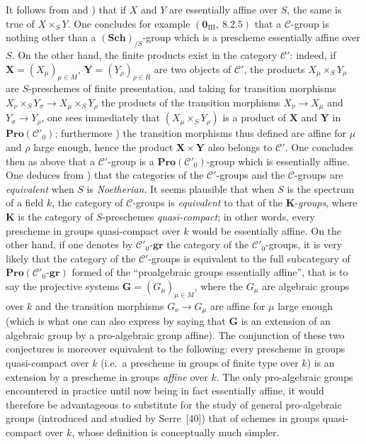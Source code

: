 \begin{remark}[8.13.6]
\label{IV.8.13.6}
It follows from  and ) that if $X$ and $Y$ are essentially affine over $S$, the same is true of $X\times_S Y$.
One concludes for example $(\mathbf{0}_{\text{III}},~8.2.5)$ that a $\mathcal{C}$-group is nothing other than a $(\mathbf{Sch})_{/S}$-group which is a prescheme essentially affine over $S$.
On the other hand, the finite products exist in the category $\mathcal{C}'$: indeed, if $\mathbf{X}=(X_\mu)_{\mu\in M}$, $\mathbf{Y}=(Y_\rho)_{\rho\in R}$ are two objects of $\mathcal{C}'$, the products $X_\mu\times_S Y_\rho$ are $S$-preschemes of finite presentation, and taking for transition morphisms $X_\nu\times_S Y_\sigma\to X_\mu\times_S Y_\rho$ the products of the transition morphisms $X_\nu\to X_\mu$ and $Y_\sigma\to Y_\rho$, one sees immediately that $(X_\mu\times_S Y_\rho)$ is a product of $\mathbf{X}$ and $\mathbf{Y}$ in $\mathbf{Pro}(\mathcal{C}'_0)$; furthermore ) the transition morphisms thus defined are affine for $\mu$ and $\rho$ large enough, hence the product $\mathbf{X}\times\mathbf{Y}$ also belongs to $\mathcal{C}'$.
One concludes then as above that a $\mathcal{C}'$-group is a $\mathbf{Pro}(\mathcal{C}'_0)$-group which is essentially affine.
One deduces from ) that the categories of the $\mathcal{C}'$-groups and the $\mathcal{C}$-groups are \emph{equivalent} when $S$ is \emph{Noetherian}.
It seems plausible that when $S$ is the spectrum of a field $k$, the category of $\mathcal{C}$-groups is \emph{equivalent} to that of the $\boldsymbol{K}$-\emph{groups}, where $\boldsymbol{K}$ is the category of $S$-preschemes \emph{quasi-compact}; in other words, every prescheme in groups quasi-compact over $k$ would be essentially affine.
On the other hand, if one denotes
by $\mathcal{C}'_0$-$\boldsymbol{gr}$ the category of the $\mathcal{C}'_0$-groups, it is very likely that the category of the $\mathcal{C}'$-groups is equivalent to the full subcategory of $\mathbf{Pro}(\mathcal{C}'_0\text{-}\boldsymbol{gr})$ formed of the ``proalgebraic groups essentially affine'', that is to say the projective systems $\mathbf{G}=(G_\mu)_{\mu\in M}$, where the $G_\mu$ are algebraic groups over $k$ and the transition morphisms $G_\nu\to G_\mu$ are affine for $\mu$ large enough (which is what one can also express by saying that $\mathbf{G}$ is an extension of an algebraic group by a pro-algebraic group affine).
The conjunction of these two conjectures is moreover equivalent to the following: every prescheme in groups quasi-compact over $k$ (i.e.\ a prescheme in groups of finite type over $k$) is an extension by a prescheme in groups \emph{affine} over $k$.
The only pro-algebraic groups encountered in practice until now being in fact essentially affine, it would therefore be advantageous to substitute for the study of general pro-algebraic groups (introduced and studied by Serre~[40]) that of schemes in groups quasi-compact over $k$, whose definition is conceptually much simpler.
\end{remark}


